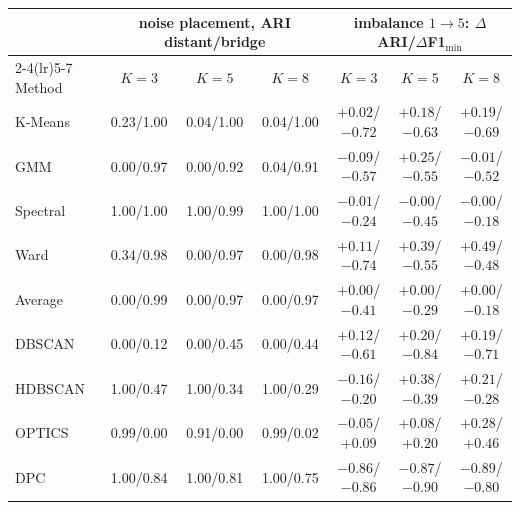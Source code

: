 \begin{tabular}{@{}lcccccc@{}}
\toprule
 & \multicolumn{3}{c}{noise placement, ARI distant/bridge} & \multicolumn{3}{c}{imbalance $1 \to 5$: $\Delta$ARI/$\Delta$F1$_{\min}$} \\
\cmidrule(lr){2-4}\cmidrule(lr){5-7}
Method & $K=3$ & $K=5$ & $K=8$ & $K=3$ & $K=5$ & $K=8$ \\
\midrule
K-Means & 0.23/1.00 & 0.04/1.00 & 0.04/1.00 & $+0.02$/$-0.72$ & $+0.18$/$-0.63$ & $+0.19$/$-0.69$ \\
GMM & 0.00/0.97 & 0.00/0.92 & 0.04/0.91 & $-0.09$/$-0.57$ & $+0.25$/$-0.55$ & $-0.01$/$-0.52$ \\
Spectral & 1.00/1.00 & 1.00/0.99 & 1.00/1.00 & $-0.01$/$-0.24$ & $-0.00$/$-0.45$ & $-0.00$/$-0.18$ \\
Ward & 0.34/0.98 & 0.00/0.97 & 0.00/0.98 & $+0.11$/$-0.74$ & $+0.39$/$-0.55$ & $+0.49$/$-0.48$ \\
Average & 0.00/0.99 & 0.00/0.97 & 0.00/0.97 & $+0.00$/$-0.41$ & $+0.00$/$-0.29$ & $+0.00$/$-0.18$ \\
DBSCAN & 0.00/0.12 & 0.00/0.45 & 0.00/0.44 & $+0.12$/$-0.61$ & $+0.20$/$-0.84$ & $+0.19$/$-0.71$ \\
HDBSCAN & 1.00/0.47 & 1.00/0.34 & 1.00/0.29 & $-0.16$/$-0.20$ & $+0.38$/$-0.39$ & $+0.21$/$-0.28$ \\
OPTICS & 0.99/0.00 & 0.91/0.00 & 0.99/0.02 & $-0.05$/$+0.09$ & $+0.08$/$+0.20$ & $+0.28$/$+0.46$ \\
DPC & 1.00/0.84 & 1.00/0.81 & 1.00/0.75 & $-0.86$/$-0.86$ & $-0.87$/$-0.90$ & $-0.89$/$-0.80$ \\
\bottomrule
\end{tabular}

